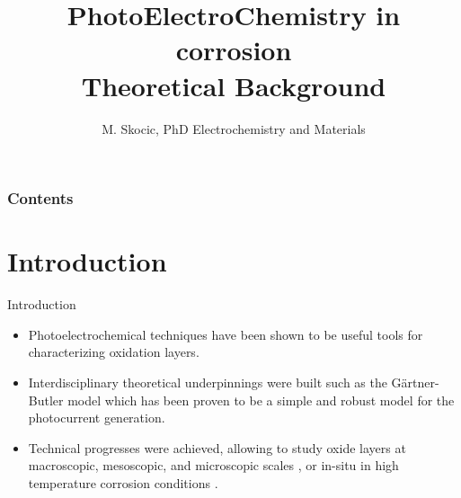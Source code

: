 \documentclass[10pt,compress]{beamer}
\title{PhotoElectroChemistry in corrosion\\ Theoretical Background}
\author{M. Skocic, PhD Electrochemistry and Materials}
\begin{document}
\begin{frame}
    \titlepage
\end{frame}

\begin{frame}
    \frametitle{Contents}
    \tableofcontents
\end{frame}



\section{Introduction}
    \begin{frame}{Introduction}
    \begin{itemize}
        \item Photoelectrochemical techniques have been shown to be useful tools for characterizing oxidation layers. 
        \item Interdisciplinary theoretical underpinnings were built \citep{morrison1980, vijh1969, stimming1986, diquarto1997, wouters2007} 
              such as the Gärtner-Butler model \citep{gaertner1959,butler1977}
              which has been proven to be a simple and robust model for the photocurrent generation. 
        \item Technical progresses were achieved, allowing to study oxide layers at 
              macroscopic, mesoscopic, and microscopic scales 
              \citep{benaboud2007, srisrual2011}, or in-situ in high temperature corrosion 
              conditions \citep{bojinov2002,skocic2016}.
    \end{itemize}
    \end{frame}
\end{document}
